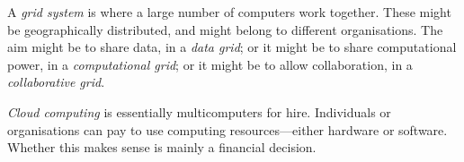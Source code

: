 A \emph{grid system} is where a large number of computers work together.
These might be geographically distributed, and might belong to different
organisations.  The aim might be to share data, in a \emph{data grid}; or it
might be to share computational power, in a \emph{computational grid}; or it
might be to allow collaboration, in a \emph{collaborative grid}. 

\emph{Cloud computing} is essentially multicomputers for hire.  Individuals or
organisations can pay to use computing resources---either hardware or
software.  Whether this makes sense is mainly a financial decision.

%
%










